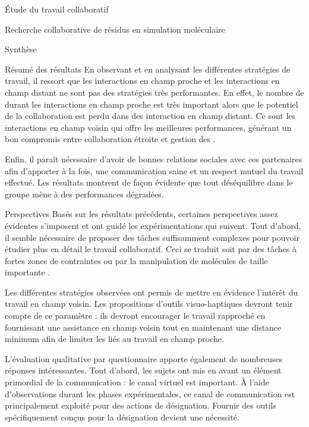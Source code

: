 \documentclass[myfrancais]{mythesis}
\begin{document}
\begin{mypart}{Étude du travail collaboratif}
\begin{mychapter}{Recherche collaborative de résidus en simulation moléculaire}
\begin{mysection}{Synthèse}
\begin{mysubsection}{Résumé des résultats}
					En observant et en analysant les différentes stratégies de travail, il ressort que les interactions en champ proche et les interactions en champ distant ne sont pas des stratégies très performantes.
					En effet, le nombre de  durant les interactions en champ proche est très important alors que le potentiel de la collaboration est perdu dans des interaction en champ distant.
					Ce sont les interactions en champ voisin qui offre les meilleures performances, générant un bon compromis entre collaboration étroite et gestion des .

					Enfin, il paraît nécessaire d'avoir de bonnes relations sociales avec ces partenaires afin d'apporter à la fois, une communication saine et un respect mutuel du travail effectué.
					Les résultats montrent de façon évidente que tout déséquilibre dans le groupe mène à des performances dégradées.
				\end{mysubsection}
				\begin{mysubsection}{Perspectives}
					Basés sur les résultats précédents, certaines perspectives assez évidentes s'imposent et ont guidé les expérimentations qui suivent.
					Tout d'abord, il semble nécessaire de proposer des tâches suffisamment complexes pour pouvoir étudier plus en détail le travail collaboratif.
					Ceci se traduit soit par des tâches à fortes zones de contraintes  ou par la manipulation de molécules de taille importante .

					Les différentes stratégies observées ont permis de mettre en évidence l'intérêt du travail en champ voisin.
					Les propositions d'outils visuo-haptiques devront tenir compte de ce paramètre : ils devront encourager le travail rapproché en fournissant une assistance en champ voisin tout en maintenant une distance minimum afin de limiter les  liés au travail en champ proche.

					L'évaluation qualitative par questionnaire apporte également de nombreuses réponses intéressantes.
					Tout d'abord, les sujets ont mis en avant un élément primordial de la communication : le canal virtuel est important.
					À l'aide d'observations durant les phases expérimentales, ce canal de communication est principalement exploité pour des actions de désignation.
					Fournir des outils spécifiquement conçus pour la désignation devient une nécessité.


\end{mysubsection}
\end{mysection}
\end{mychapter}
\end{mypart}
\end{document}
